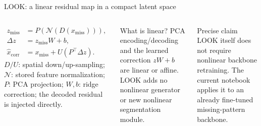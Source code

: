 \documentclass[aspectratio=169,11pt]{beamer}
\begin{document}
\begin{frame}{LOOK: a linear residual map in a compact latent space}
  \begin{columns}[T,onlytextwidth]
      \begin{align*}
        z_{\mathrm{miss}} &= P\!\left(\mathcal{N}(D(x_{\mathrm{miss}}))\right),\\
        \Delta z &= z_{\mathrm{miss}}W+b,\\
        \widehat{x}_{\mathrm{corr}} &= x_{\mathrm{miss}}
          + U\!\left(P^{\top}\Delta z\right).
      \end{align*}
      \footnotesize
      $D/U$: spatial down/up-sampling; $\mathcal{N}$: stored feature normalization;
      $P$: PCA projection; $W,b$: ridge correction; the decoded residual is injected directly.
      \begin{exampleblock}{What is linear?}
        PCA encoding/decoding and the learned correction $zW+b$ are linear or affine. LOOK adds no
        nonlinear generator or new nonlinear segmentation module.
      \end{exampleblock}
      \begin{alertblock}{Precise claim}
        LOOK itself does not require nonlinear backbone retraining. The current notebook applies it
        to an already fine-tuned missing-pattern backbone.
      \end{alertblock}
  \end{columns}
\end{frame}
\end{document}
